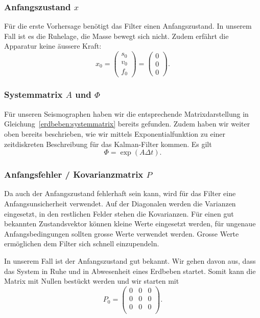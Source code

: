 \subsubsection*{Anfangszustand $x$}
Für die erste Vorhersage benötigt das Filter einen Anfangszustand.
In unserem Fall ist es die Ruhelage, die Masse bewegt sich nicht. 
Zudem erfährt die Apparatur keine äussere Kraft:
\[ {x_0 }= \left( \begin{array}{c} {s_0}\\ {v_0}\\{f_0}\end{array}\right) = \left( \begin{array}{c} 0\\ 0\\ 0\end{array}\right). \]

\subsubsection*{Systemmatrix $A$ und $\Phi$}
Für unseren Seismographen haben wir die entsprechende Matrixdarstellung
in Gleichung~\eqref{erdbeben:systemmatrix} bereits gefunden.
Zudem haben wir weiter oben bereits beschrieben,
wie wir mittels Exponentialfunktion zu einer zeitdiskreten Beschreibung für das Kalman-Filter kommen.
Es gilt
\[ \Phi = \exp(A \Delta t) .\]

\subsubsection*{Anfangsfehler / Kovarianzmatrix $P$}
Da auch der Anfangszustand fehlerhaft sein kann, wird für das Filter eine Anfangsunsicherheit verwendet. 
Auf der Diagonalen werden die Varianzen eingesetzt, in den restlichen Felder stehen die Kovarianzen.
Für einen gut bekannten Zustandsvektor können kleine Werte eingesetzt werden, für ungenaue Anfangsbedingungen sollten grosse Werte verwendet werden. 
Grosse Werte ermöglichen dem Filter sich schnell einzupendeln. 

In unserem Fall ist der Anfangszustand gut bekannt. 
Wir gehen davon aus,
dass das System in Ruhe und in Abwesenheit eines Erdbeben startet.
Somit kann die Matrix mit Nullen bestückt werden und wir starten mit
\[ 
P_0 =
\begin{pmatrix}
0 & 0 &0 \\ 
0 &0 & 0 \\ 
0 & 0 &0 \\
\end{pmatrix}
.
 \] 


